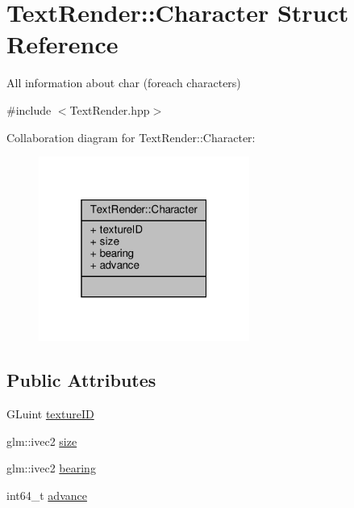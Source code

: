 \hypertarget{struct_text_render_1_1_character}{}\section{Text\+Render\+:\+:Character Struct Reference}
\label{struct_text_render_1_1_character}


All information about char (foreach characters)  




{\ttfamily \#include $<$Text\+Render.\+hpp$>$}



Collaboration diagram for Text\+Render\+:\+:Character\+:
\nopagebreak
\begin{figure}[H]
\begin{center}
\leavevmode
\includegraphics[width=196pt]{struct_text_render_1_1_character__coll__graph}
\end{center}
\end{figure}
\subsection*{Public Attributes}
\begin{DoxyCompactItemize}
\item 
G\+Luint \hyperlink{struct_text_render_1_1_character_a0117444d6568a7d9fabbb23791ede917}{texture\+ID}
\item 
glm\+::ivec2 \hyperlink{struct_text_render_1_1_character_a9d30d3a2ddff19c2d41cd410037c2c5a}{size}
\item 
glm\+::ivec2 \hyperlink{struct_text_render_1_1_character_a41a49b7c29e066cbd95392302a638d97}{bearing}
\item 
int64\+\_\+t \hyperlink{struct_text_render_1_1_character_a48f29af54547195b638fa80f12f0f75f}{advance}
\end{DoxyCompactItemize}


